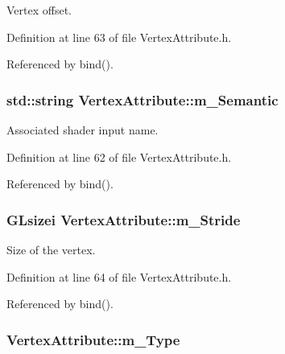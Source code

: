 Vertex offset. 



Definition at line 63 of file Vertex\+Attribute.\+h.



Referenced by bind().

\subsubsection[{\texorpdfstring{m\+\_\+\+Semantic}{m_Semantic}}]{\setlength{\rightskip}{0pt plus 5cm}std\+::string Vertex\+Attribute\+::m\+\_\+\+Semantic\hspace{0.3cm}{\ttfamily [private]}}\hypertarget{class_vertex_attribute_abff460f38ece89d9eccdb6c92e667ebd}{}\label{class_vertex_attribute_abff460f38ece89d9eccdb6c92e667ebd}


Associated shader input name. 



Definition at line 62 of file Vertex\+Attribute.\+h.



Referenced by bind().

\subsubsection[{\texorpdfstring{m\+\_\+\+Stride}{m_Stride}}]{\setlength{\rightskip}{0pt plus 5cm}G\+Lsizei Vertex\+Attribute\+::m\+\_\+\+Stride\hspace{0.3cm}{\ttfamily [private]}}\hypertarget{class_vertex_attribute_af1d7ac6261c307a4ba190dbc65f0d083}{}\label{class_vertex_attribute_af1d7ac6261c307a4ba190dbc65f0d083}


Size of the vertex. 



Definition at line 64 of file Vertex\+Attribute.\+h.



Referenced by bind().

\subsubsection[{\texorpdfstring{m\+\_\+\+Type}{m_Type}}]{ Vertex\+Attribute\+::m\+\_\+\+Type\hspace{0.3cm}{\ttfamily [private]}}\hypertarget{class_vertex_attribute_a5ad1bf49939bd899afb0896d99b441a8}{}\label{class_vertex_attribute_a5ad1bf49939bd899afb0896d99b441a8}


